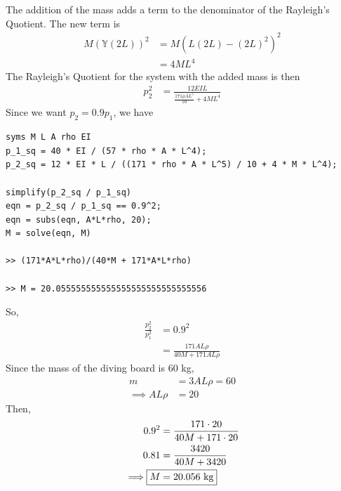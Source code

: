 The addition of the mass adds a term to the denominator of the Rayleigh's Quotient. The new term is 
\begin{align*}
    M \left(\mathbb{Y}(2L)\right)^2 &= M \left(L(2L) - (2L)^2\right)^2 \\
    &= 4M L^4
\end{align*}
The Rayleigh's Quotient for the system with the added mass is then
\begin{align*}
    p_2^2 &= \frac{12 EI L}{\frac{171 \rho A L^5}{10} + 4M L^4} 
\end{align*}
Since we want $p_2 = 0.9 p_1$, we have
\begin{verbatim}
syms M L A rho EI
p_1_sq = 40 * EI / (57 * rho * A * L^4);
p_2_sq = 12 * EI * L / ((171 * rho * A * L^5) / 10 + 4 * M * L^4);

simplify(p_2_sq / p_1_sq)
eqn = p_2_sq / p_1_sq == 0.9^2;
eqn = subs(eqn, A*L*rho, 20);
M = solve(eqn, M)

>> (171*A*L*rho)/(40*M + 171*A*L*rho)

>> M = 20.055555555555555555555555555556
\end{verbatim}
So,
\begin{align*}
    \frac{p_2^2}{p_1^2} &= 0.9^2 \\
    &= \frac{171 A L \rho}{40 M + 171 A L \rho} 
\end{align*}
Since the mass of the diving board is 60 kg, 
\begin{align*}
    m &= 3 A L \rho = 60 \\
    \implies A L \rho &= 20
\end{align*}
Then,
\begin{align*}
    0.9^2 &= \frac{171 \cdot 20}{40 M + 171 \cdot 20} \\
    0.81 &= \frac{3420}{40 M + 3420} \\
    \implies \Aboxed{M &= 20.056 \text{ kg}}
\end{align*}